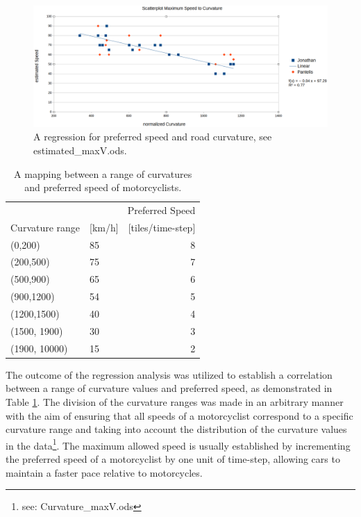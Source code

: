 \begin{figure}
    \centering
    \includegraphics[width=1.0\linewidth]{images/regression.png}
    \caption{A regression for preferred speed and road curvature, see estimated\_maxV.ods.}
    \label{fig:regressionPrefspeed}
\end{figure}

    \begin{table}
    \centering
    \begin{tabular}{@{}llr@{}} \toprule
    \multicolumn{3}{r}{Preferred Speed}             \\ \cmidrule(l){2-3}
        Curvature range & [km/h] & [tiles/time-step]        \\ \midrule
        (0,200)         & 85        & 8 \\
        (200,500)       & 75        & 7 \\
        (500,900)       & 65        & 6 \\
        (900,1200)      & 54        & 5 \\
        (1200,1500)     & 40        & 4 \\
        (1500, 1900)    & 30        & 3 \\
        (1900, 10000)   & 15        & 2 \\ \bottomrule
    \end{tabular}
    \caption{A mapping between a range of curvatures and preferred speed of motorcyclists.} 
    \label{tab:dictPrefspeed}
    \end{table}
The outcome of the regression analysis was utilized to establish a correlation between a range of curvature values and preferred speed, as demonstrated in Table \ref{tab:dictPrefspeed}. The division of the curvature ranges was made in an arbitrary manner with the aim of ensuring that all speeds of a motorcyclist correspond to a specific curvature range and taking into account the distribution of the curvature values in the data\footnote{see: Curvature\_maxV.ods}. The maximum allowed speed is usually established by incrementing the preferred speed of a motorcyclist by one unit of time-step, allowing cars to maintain a faster pace relative to motorcycles.

